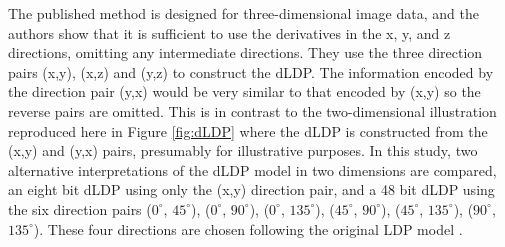 \documentclass{report}
\begin{document}
The published method is designed for three-dimensional image data, and the authors show that it is sufficient to use the derivatives in the x, y, and z directions, omitting any intermediate directions. They use the three direction pairs (x,y), (x,z) and (y,z) to construct the dLDP. The information encoded by the direction pair (y,x) would be very similar to that encoded by (x,y) so the reverse pairs are omitted. This is in contrast to the two-dimensional illustration reproduced here in Figure \ref{fig:dLDP} where the dLDP is constructed from the (x,y) and (y,x) pairs, presumably for illustrative purposes. In this study, two alternative interpretations of the dLDP model in two dimensions are compared, an eight bit dLDP using only the (x,y) direction pair, and a 48 bit dLDP using the six direction pairs ($0^{\circ}$, $45^{\circ}$), ($0^{\circ}$, $90^{\circ}$), ($0^{\circ}$, $135^{\circ}$), ($45^{\circ}$, $90^{\circ}$), ($45^{\circ}$, $135^{\circ}$), ($90^{\circ}$, $135^{\circ}$). These four directions are chosen following the original LDP model \citep{zhang2009local}.
\end{document}

